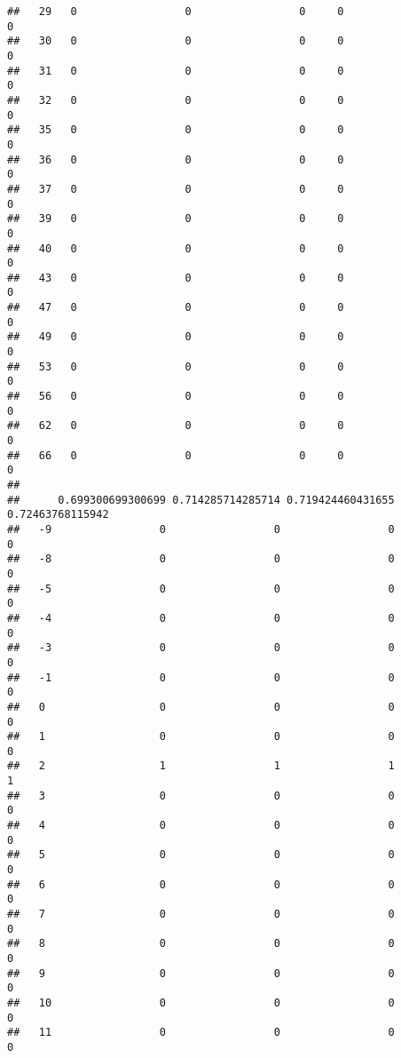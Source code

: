\documentclass[]{article}
\begin{document}
\begin{verbatim}
##   29   0                 0                 0     0                 0
##   30   0                 0                 0     0                 0
##   31   0                 0                 0     0                 0
##   32   0                 0                 0     0                 0
##   35   0                 0                 0     0                 0
##   36   0                 0                 0     0                 0
##   37   0                 0                 0     0                 0
##   39   0                 0                 0     0                 0
##   40   0                 0                 0     0                 0
##   43   0                 0                 0     0                 0
##   47   0                 0                 0     0                 0
##   49   0                 0                 0     0                 0
##   53   0                 0                 0     0                 0
##   56   0                 0                 0     0                 0
##   62   0                 0                 0     0                 0
##   66   0                 0                 0     0                 0
##     
##      0.699300699300699 0.714285714285714 0.719424460431655 0.72463768115942
##   -9                 0                 0                 0                0
##   -8                 0                 0                 0                0
##   -5                 0                 0                 0                0
##   -4                 0                 0                 0                0
##   -3                 0                 0                 0                0
##   -1                 0                 0                 0                0
##   0                  0                 0                 0                0
##   1                  0                 0                 0                0
##   2                  1                 1                 1                1
##   3                  0                 0                 0                0
##   4                  0                 0                 0                0
##   5                  0                 0                 0                0
##   6                  0                 0                 0                0
##   7                  0                 0                 0                0
##   8                  0                 0                 0                0
##   9                  0                 0                 0                0
##   10                 0                 0                 0                0
##   11                 0                 0                 0                0

\end{verbatim}
\end{document}
